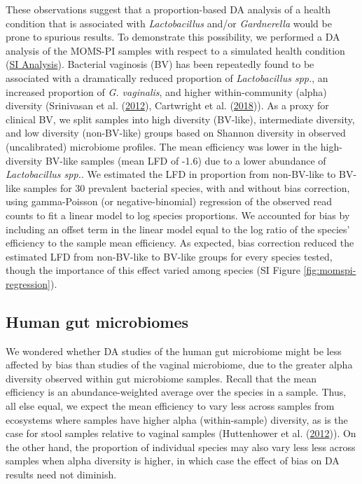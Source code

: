 \documentclass[
]{article}
\begin{document}
These observations suggest that a proportion-based DA analysis of a health condition that is associated with \emph{Lactobacillus} and/or \emph{Gardnerella} would be prone to spurious results.
To demonstrate this possibility, we performed a DA analysis of the MOMS-PI samples with respect to a simulated health condition
(\href{https://mikemc.github.io/differential-abundance-theory/notebook/posts/2021-12-15-momspi-regression-diversity}{SI Analysis}).
Bacterial vaginosis (BV) has been repeatedly found to be associated with a dramatically reduced proportion of \emph{Lactobacillus spp.}, an increased proportion of \emph{G. vaginalis}, and higher within-community (alpha) diversity (Srinivasan et al. (\protect\hyperlink{ref-srinivasan2012bact}{2012}), Cartwright et al. (\protect\hyperlink{ref-cartwright2018mult}{2018})).
As a proxy for clinical BV, we split samples into high diversity (BV-like), intermediate diversity, and low diversity (non-BV-like) groups based on Shannon diversity in observed (uncalibrated) microbiome profiles.
The mean efficiency was lower in the high-diversity BV-like samples (mean LFD of -1.6) due to a lower abundance of \emph{Lactobacillus spp.}.
We estimated the LFD in proportion from non-BV-like to BV-like samples for 30 prevalent bacterial species, with and without bias correction, using gamma-Poisson (or negative-binomial) regression of the observed read counts to fit a linear model to log species proportions.
We accounted for bias by including an offset term in the linear model equal to the log ratio of the species' efficiency to the sample mean efficiency.
As expected, bias correction reduced the estimated LFD from non-BV-like to BV-like groups for every species tested, though the importance of this effect varied among species (SI Figure \ref{fig:momspi-regression}).

\hypertarget{human-gut-microbiomes}{%
\subsection{Human gut microbiomes}\label{human-gut-microbiomes}}

We wondered whether DA studies of the human gut microbiome might be less affected by bias than studies of the vaginal microbiome, due to the greater alpha diversity observed within gut microbiome samples.
Recall that the mean efficiency is an abundance-weighted average over the species in a sample.
Thus, all else equal, we expect the mean efficiency to vary less across samples from ecosystems where samples have higher alpha (within-sample) diversity, as is the case for stool samples relative to vaginal samples (Huttenhower et al. (\protect\hyperlink{ref-huttenhower2012stru}{2012})).
On the other hand, the proportion of individual species may also vary less less across samples when alpha diversity is higher, in which case the effect of bias on DA results need not diminish.
\end{document}
